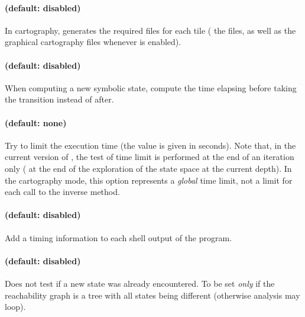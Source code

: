 \paragraph{ (default: disabled)}
In cartography, generates the required files for each tile (\ie{} the  files, as well as the graphical cartography files whenever  is enabled).



\paragraph{ (default: disabled)}
When computing a new symbolic state, compute the time elapsing before taking the transition instead of after.




\paragraph{ (default: none)}
Try to limit the execution time (the value  is given in seconds).
Note that, in the current version of \imitator{}, the test of time limit is performed at the end of an iteration only (\ie{} at the end of the exploration of the state space at the current depth).
In the cartography mode, this option represents a \emph{global} time limit, not a limit for each call to the inverse method.


\paragraph{ (default: disabled)}
Add a timing information to each shell output of the program.



\paragraph{ (default: disabled)}
Does not test if a new state was already encountered.
To be set \emph{only} if the reachability graph is a tree with all states being different (otherwise analysis may loop).




